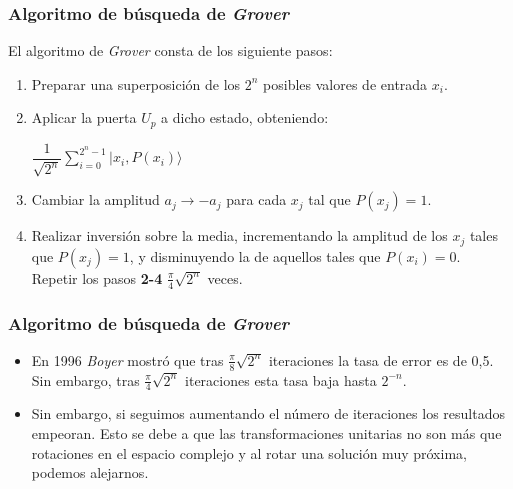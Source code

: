 \documentclass{beamer}
\newcommand{\base}[1]{|#1\rangle}
\begin{document}
\begin{frame}
	\frametitle{Algoritmo de búsqueda de \textit{Grover}}
	El algoritmo de \textit{Grover} consta de los siguiente pasos:
	\begin{enumerate}
	\item Preparar una superposición de los $2^n$ posibles valores de entrada $x_i$.
	\item Aplicar la puerta $U_p$ a dicho estado, obteniendo: 
		\begin{center}
		$\dfrac{1}{\sqrt{2^n}} \sum_{i=0}^{2^n - 1}\base{x_i,P(x_i)}$
		\end{center}
	\item Cambiar la amplitud $a_j \to -a_j$ para cada $x_j$ tal que $P(x_j) = 1$.
	\item Realizar inversión sobre la media, incrementando la amplitud de los $x_j$ tales que $P(x_j) = 1$, y disminuyendo la de aquellos tales que $P(x_i) = 0$. \\
	Repetir los pasos \textbf{2-4} $\frac{\pi}{4}\sqrt{2^n}$ veces.
	\end{enumerate}
\end{frame}

\begin{frame}
	\frametitle{Algoritmo de búsqueda de \textit{Grover}}
	\begin{itemize}
	\item En 1996  \textit{Boyer} mostró que tras $\frac{\pi}{8}\sqrt{2^n}$ iteraciones la tasa de error es de 0,5. Sin embargo, tras $\frac{\pi}{4}\sqrt{2^n}$ iteraciones esta tasa baja hasta $2^{-n}$.
	\item Sin embargo, si seguimos aumentando el número de iteraciones los resultados empeoran. Esto se debe a que las transformaciones unitarias no son más que rotaciones en el espacio complejo y al rotar una solución muy próxima, podemos alejarnos.
	\end{itemize}
\end{frame}
\end{document}
